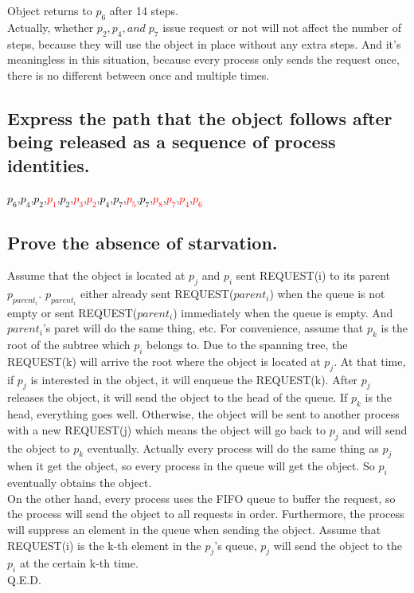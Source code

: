 \documentclass{article}
\begin{document}
Object returns to $p_6$ after 14 steps.\\

Actually, whether $p_2,p_4,and\;p_7$ issue request or not will not affect the number of steps, because they will use the object in place without any extra steps. And it's meaningless in this situation, because every process only sends the request once, there is no different between once and multiple times.

\subsection{Express the path that the object follows after being released as a sequence of process identities.}
\textcolor{black}{$p_6$},\textcolor{black}{$p_4$},\textcolor{black}{$p_2$},\textcolor{red}{$p_1$},\textcolor{black}{$p_2$},\textcolor{red}{$p_3$},\textcolor{red}{$p_2$},\textcolor{black}{$p_4$},\textcolor{black}{$p_7$},\textcolor{red}{$p_5$},\textcolor{black}{$p_7$},\textcolor{red}{$p_8$},\textcolor{red}{$p_7$},\textcolor{red}{$p_4$},\textcolor{red}{$p_6$}

\subsection{Prove the absence of starvation.}
Assume that the object is located at $p_j$ and $p_i$ sent REQUEST(i) to its parent $p_{parent_i}$. $p_{parent_i}$ either already sent REQUEST($parent_i$) when the queue is not empty or sent REQUEST($parent_i$) immediately when the queue is empty. And $parent_i$'s paret will do the same thing, etc. For convenience, assume that $p_k$ is the root of the subtree which $p_i$ belongs to. Due to the spanning tree, the REQUEST(k) will arrive the root where the object is located at $p_j$. At that time, if $p_j$ is interested in the object, it will enqueue the REQUEST(k). After $p_j$ releases the object, it will send the object to the head of the queue. If $p_k$ is the head, everything goes well. Otherwise,  the object will be sent to another process with a new REQUEST(j) which means the object will go back to $p_j$ and will send the object to $p_k$ eventually. Actually every process will do the same thing as $p_j$ when it get the object, so every process in the queue will get the object. So $p_i$ eventually obtains the object.\\
On the other hand, every process uses the FIFO queue to buffer the request, so the process will send the object to all requests in order. Furthermore, the process will suppress an element in the queue when sending the object. Assume that REQUEST(i) is the k-th element in the $p_j$'s queue, $p_j$ will send the object to the $p_i$ at the certain k-th time.\\
Q.E.D.
\end{document}
